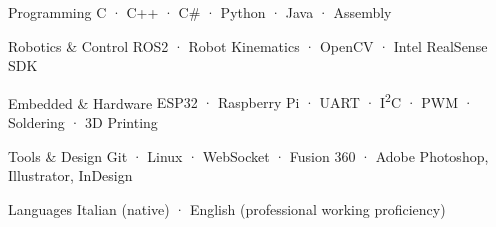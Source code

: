\documentclass[10pt, a4paper]{awesome-cv}
\begin{document}
\begin{cvskills}

  \cvskill
    {Programming}
    {C \hspace{4pt}·\hspace{4pt} C++ \hspace{4pt}·\hspace{4pt} C\# \hspace{4pt}·\hspace{4pt} Python \hspace{4pt}·\hspace{4pt} Java \hspace{4pt}·\hspace{4pt} Assembly}

  \cvskill
    {Robotics \& Control}
    {ROS2 \hspace{4pt}·\hspace{4pt} Robot Kinematics \hspace{4pt}·\hspace{4pt} OpenCV \hspace{4pt}·\hspace{4pt} Intel RealSense SDK}

  \cvskill
    {Embedded \& Hardware}
    {ESP32 \hspace{4pt}·\hspace{4pt} Raspberry Pi \hspace{4pt}·\hspace{4pt} UART \hspace{4pt}·\hspace{4pt} I\textsuperscript{2}C \hspace{4pt}·\hspace{4pt} PWM \hspace{4pt}·\hspace{4pt} Soldering \hspace{4pt}·\hspace{4pt} 3D Printing}

  \cvskill
    {Tools \& Design}
    {Git \hspace{4pt}·\hspace{4pt} Linux \hspace{4pt}·\hspace{4pt} WebSocket \hspace{4pt}·\hspace{4pt} Fusion 360 \hspace{4pt}·\hspace{4pt} Adobe Photoshop, Illustrator, InDesign}

  \cvskill
    {Languages}
    {Italian (native) \hspace{4pt}·\hspace{4pt} English (professional working proficiency)}

\end{cvskills}
\end{document}
